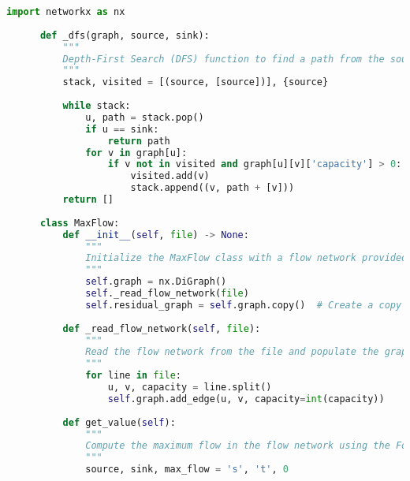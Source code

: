 \documentclass[a4paper]{exam}
\begin{document}
\begin{questions}

  
  \begin{solution}
    \begin{lstlisting}[language=Python, caption={Python code for MaxFlow class with Ford-Fulkerson algorithm.}, label={lst:maxflow}]
      import networkx as nx
      
      def _dfs(graph, source, sink):
          """
          Depth-First Search (DFS) function to find a path from the source to the sink in the graph.
          """
          stack, visited = [(source, [source])], {source}
      
          while stack:
              u, path = stack.pop()
              if u == sink:
                  return path
              for v in graph[u]:
                  if v not in visited and graph[u][v]['capacity'] > 0:
                      visited.add(v)
                      stack.append((v, path + [v]))
          return []
      
      class MaxFlow:
          def __init__(self, file) -> None:
              """
              Initialize the MaxFlow class with a flow network provided in the given file.
              """
              self.graph = nx.DiGraph()
              self._read_flow_network(file)
              self.residual_graph = self.graph.copy()  # Create a copy of the graph for the residual network
      
          def _read_flow_network(self, file):
              """
              Read the flow network from the file and populate the graph.
              """
              for line in file:
                  u, v, capacity = line.split()
                  self.graph.add_edge(u, v, capacity=int(capacity))
      
          def get_value(self):
              """
              Compute the maximum flow in the flow network using the Ford-Fulkerson algorithm.
              """
              source, sink, max_flow = 's', 't', 0
      

\end{lstlisting}
\end{solution}
\end{questions}
\end{document}
